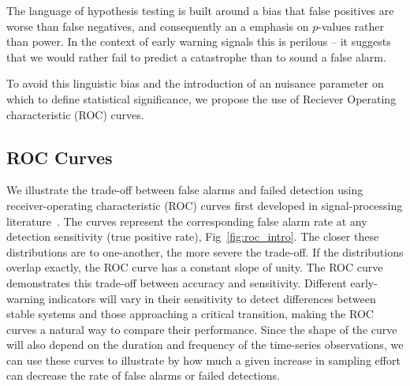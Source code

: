 \documentclass[authoryear,review,11pt]{elsarticle}
\begin{document}
The language of hypothesis testing is built around a bias that false positives are worse than false negatives, 
and consequently an a emphasis on $p$-values rather than power.  
In the context of early warning signals this is perilous -- 
it suggests that we would rather fail to predict a catastrophe than to sound a false alarm.

To avoid this linguistic bias and the introduction of an nuisance parameter on which to define statistical significance, 
we propose the use of Reciever Operating characteristic (ROC) curves.

\subsection*{ROC Curves}
We illustrate the trade-off between false alarms and failed detection using 
receiver-operating characteristic (ROC) curves first developed in signal-processing literature~\citep{Green1989, Keller2009}⁠. 
The curves represent the corresponding false alarm rate at any detection sensitivity (true positive rate), Fig~\ref{fig:roc_intro}.
The closer these distributions are to one-another, the more severe the trade-off.  
If the distributions overlap exactly, the ROC curve has a constant slope of unity.  
The ROC curve demonstrates this trade-off between accuracy and sensitivity.  
Different early-warning indicators will vary in their sensitivity to detect differences
between stable systems and those approaching a critical transition,
making the ROC curves a natural way to compare their performance.  
Since the shape of the curve will also depend on the duration and frequency of the time-series observations,
we can use these curves to illustrate by how much a given increase in sampling effort can decrease the rate of false alarms or failed detections.  
\end{document}
